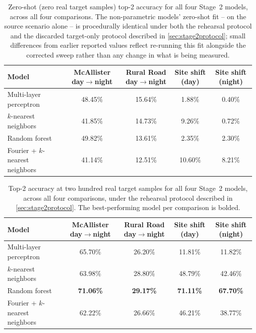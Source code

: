 \documentclass{iutbscthesis}
\begin{document}
\begin{table}[H]
    \centering
    \begin{tabular}{l c c c c}
        \toprule
        Model & McAllister day$\to$night & Rural Road day$\to$night & Site shift (day) & Site shift (night) \\
        \midrule
        Multi-layer perceptron & 48.45\% & 15.64\% & 1.88\% & 0.40\% \\
        $k$-nearest neighbors & 41.85\% & 14.73\% & 9.26\% & 0.72\% \\
        Random forest & 49.82\% & 13.61\% & 2.35\% & 2.30\% \\
        Fourier + $k$-nearest neighbors & 41.14\% & 12.51\% & 10.60\% & 8.21\% \\
        \bottomrule
    \end{tabular}
    \caption{Zero-shot (zero real target samples) top-2 accuracy for all four Stage~2 models, across all four comparisons. The non-parametric models' zero-shot fit -- on the source scenario alone -- is procedurally identical under both the rehearsal protocol and the discarded target-only protocol described in \autoref{sec:stage2protocol}; small differences from earlier reported values reflect re-running this fit alongside the corrected sweep rather than any change in what is being measured.}
    \label{tab:stage2zeroshot}
\end{table}

\begin{table}[H]
    \centering
    \begin{tabular}{l c c c c}
        \toprule
        Model & McAllister day$\to$night & Rural Road day$\to$night & Site shift (day) & Site shift (night) \\
        \midrule
        Multi-layer perceptron & 65.70\% & 26.20\% & 11.81\% & 11.82\% \\
        $k$-nearest neighbors & 63.98\% & 28.80\% & 48.79\% & 42.46\% \\
        Random forest & \textbf{71.06\%} & \textbf{29.17\%} & \textbf{71.11\%} & \textbf{67.70\%} \\
        Fourier + $k$-nearest neighbors & 62.22\% & 26.66\% & 46.21\% & 38.77\% \\
        \bottomrule
    \end{tabular}
    \caption{Top-2 accuracy at two hundred real target samples for all four Stage~2 models, across all four comparisons, under the rehearsal protocol described in \autoref{sec:stage2protocol}. The best-performing model per comparison is bolded.}
    \label{tab:stage2final}
\end{table}
\end{document}
